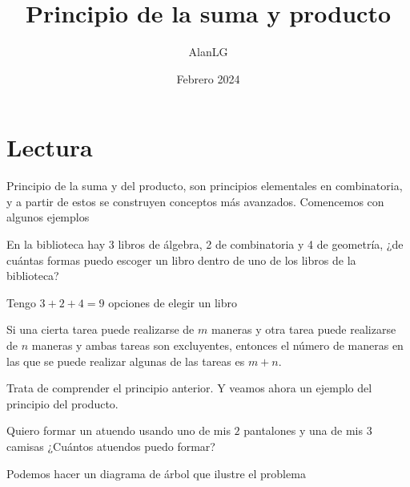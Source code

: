 \documentclass[11pt]{scrartcl}
\title{Principio de la suma y producto}
\author{AlanLG}
\date{Febrero 2024}
\begin{document}
\maketitle

\section{Lectura}
Principio de la suma y del producto, son principios elementales en combinatoria, y a partir de estos se construyen conceptos más avanzados. Comencemos con algunos ejemplos
\begin{example}
    En la biblioteca hay 3 libros de álgebra, 2 de combinatoria y 4 de geometría, ¿de cuántas formas puedo escoger un libro dentro de uno de los libros de la biblioteca?
\end{example}
\begin{flushleft}
 Tengo $3+2+4=9$ opciones de elegir un libro
\end{flushleft}
\begin{principio}
    Si una cierta tarea puede realizarse de $m$ maneras y otra tarea puede realizarse de $n$ maneras y ambas tareas son excluyentes, entonces el número de maneras en las que se puede realizar algunas de las tareas es $m+n$.
\end{principio}
Trata de comprender el principio anterior. Y veamos ahora un ejemplo del principio del producto.

\begin{example}
    Quiero formar un atuendo usando uno de mis $2$ pantalones y una de mis $3$ camisas ¿Cuántos atuendos puedo formar?
\end{example}
Podemos hacer un diagrama de árbol que ilustre el problema
\end{document}
